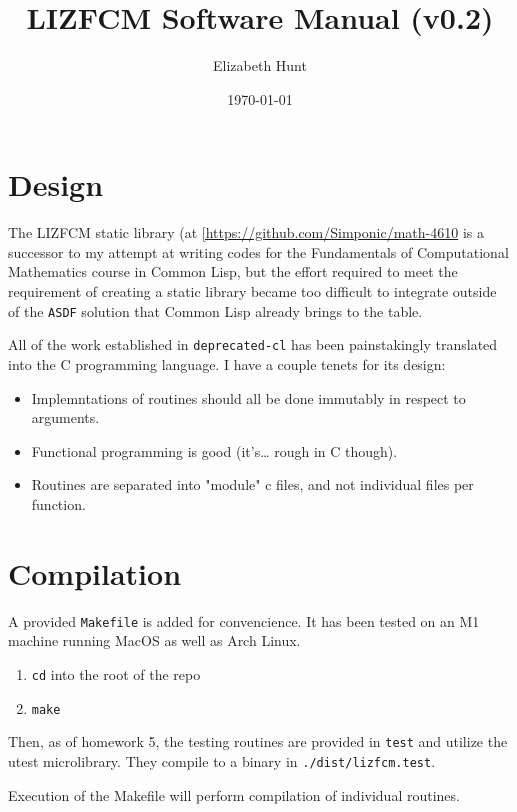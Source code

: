 \documentclass[11pt]{article}
\author{Elizabeth Hunt}
\date{\today}
\title{LIZFCM Software Manual (v0.2)}
\begin{document}
\maketitle
\tableofcontents

\setlength\parindent{0pt}

\section{Design}
\label{sec:org7204e7c}
The LIZFCM static library (at \href{https://github.com/Simponic/math-4610}{[https://github.com/Simponic/math-4610} is a successor to my
attempt at writing codes for the Fundamentals of Computational Mathematics course in Common
Lisp, but the effort required to meet the requirement of creating a static library became
too difficult to integrate outside of the \texttt{ASDF} solution that Common Lisp already brings
to the table.

All of the work established in \texttt{deprecated-cl} has been painstakingly translated into
the C programming language. I have a couple tenets for its design:

\begin{itemize}
\item Implemntations of routines should all be done immutably in respect to arguments.
\item Functional programming is good (it's\ldots{} rough in C though).
\item Routines are separated into "module" c files, and not individual files per function.
\end{itemize}

\section{Compilation}
\label{sec:org16cc307}
A provided \texttt{Makefile} is added for convencience. It has been tested on an M1 machine running MacOS as
well as Arch Linux.

\begin{enumerate}
\item \texttt{cd} into the root of the repo
\item \texttt{make}
\end{enumerate}

Then, as of homework 5, the testing routines are provided in \texttt{test} and utilize the
utest microlibrary. They compile to a binary in \texttt{./dist/lizfcm.test}.

Execution of the Makefile will perform compilation of individual routines.
\end{document}
